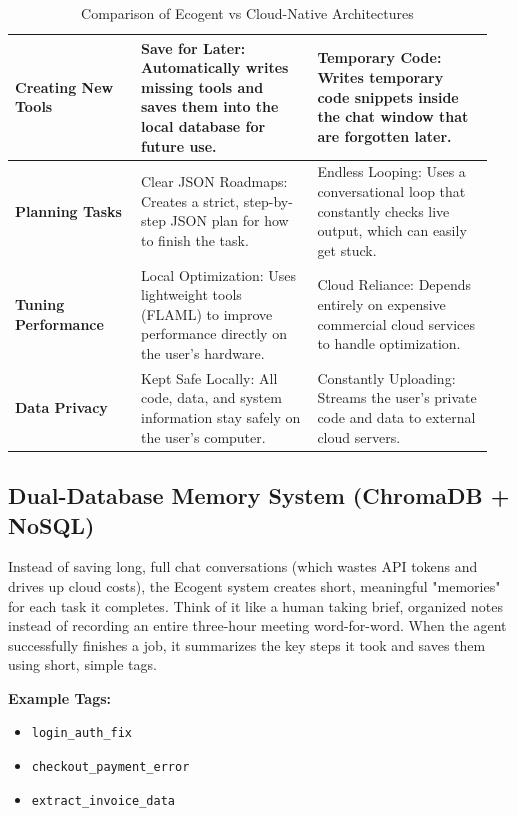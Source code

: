 \begin{table}[H]
{\begin{tabular}{|p{0.25\linewidth}|p{0.35\linewidth}|p{0.35\linewidth}|}
\textbf{Creating New Tools} & Save for Later: Automatically writes missing tools and saves them into the local database for future use. & Temporary Code: Writes temporary code snippets inside the chat window that are forgotten later. \\ \hline
\textbf{Planning Tasks} & Clear JSON Roadmaps: Creates a strict, step-by-step JSON plan for how to finish the task. & Endless Looping: Uses a conversational loop that constantly checks live output, which can easily get stuck. \\ \hline
\textbf{Tuning Performance} & Local Optimization: Uses lightweight tools (FLAML) to improve performance directly on the user's hardware. & Cloud Reliance: Depends entirely on expensive commercial cloud services to handle optimization. \\ \hline
\textbf{Data Privacy} & Kept Safe Locally: All code, data, and system information stay safely on the user's computer. & Constantly Uploading: Streams the user's private code and data to external cloud servers. \\ \hline
\end{tabular}%
}
\caption{Comparison of Ecogent vs Cloud-Native Architectures}
\label{tab:architecture_comparison}
\end{table}



\subsection{Dual-Database Memory System (ChromaDB + NoSQL)}
Instead of saving long, full chat conversations (which wastes API tokens and drives up cloud costs), the Ecogent system creates short, meaningful "memories" for each task it completes. Think of it like a human taking brief, organized notes instead of recording an entire three-hour meeting word-for-word. When the agent successfully finishes a job, it summarizes the key steps it took and saves them using short, simple tags. 

\textbf{Example Tags:}
\begin{itemize}
    \item \texttt{login\_auth\_fix}
    \item \texttt{checkout\_payment\_error}
    \item \texttt{extract\_invoice\_data}
\end{itemize}

